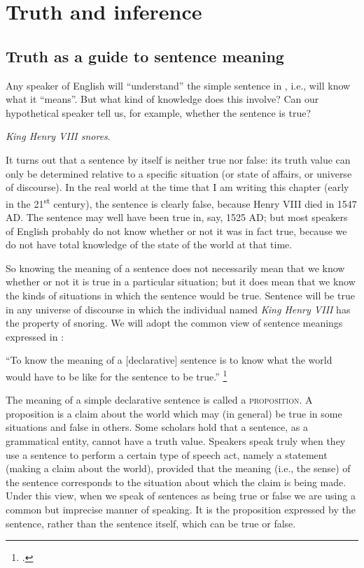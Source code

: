 \chapter{Truth and inference}\label{sec:3}

\section{Truth as a guide to sentence meaning}\label{sec:3.1}

Any speaker of English will “understand” the simple sentence in , i.e., will know what it “means”. But what kind of knowledge does this involve? Can our hypothetical speaker tell us, for example, whether the sentence is true?


\ea \label{ex:3.1}
\textit{King Henry VIII snores}.
\z


It turns out that a sentence by itself is neither true nor false: its truth value can only be determined relative to a specific situation (or state of affairs, or universe of discourse). In the real world at the time that I am writing this chapter (early in the 21\textsuperscript{st} century), the sentence is clearly false, because Henry VIII died in 1547 AD. The sentence may well have been true in, say, 1525 AD; but most speakers of English probably do not know whether or not it was in fact true, because we do not have total knowledge of the state of the world at that time.



So knowing the meaning of a sentence does not necessarily mean that we know whether or not it is true in a particular situation; but it does mean that we know the kinds of situations in which the sentence would be true. Sentence  will be true in any universe of discourse in which the individual named \textit{King Henry VIII} has the property of snoring. We will adopt the common view of sentence meanings expressed in :


\ea \label{ex:3.2}
“To know the meaning of a [declarative] sentence is to know what the world would have to be like for the sentence to be true.” \footnote{\citet[4]{DowtyEtAl1981}.}
\z


The meaning of a simple declarative sentence is called a \textsc{proposition}. A proposition is a claim about the world which may (in general) be true in some situations and false in others. Some scholars hold that a sentence, as a grammatical entity, cannot have a truth value. Speakers speak truly when they use a sentence to perform a certain type of speech act, namely a statement (making a claim about the world), provided that the meaning (i.e., the sense) of the sentence corresponds to the situation about which the claim is being made. Under this view, when we speak of sentences as being true or false we are using a common but imprecise manner of speaking. It is the proposition expressed by the sentence, rather than the sentence itself, which can be true or false.



